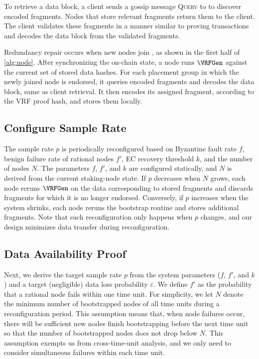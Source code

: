 To retrieve a data block, a client sends a gossip message \textsc{Query} to \sys to discover encoded fragments.
Nodes that store relevant fragments return them to the client.
The client validates these fragments in a manner similar to proving transactions and decodes the data block from the validated fragments.


Redundancy repair occurs when new nodes join \sys, as shown in the first half of \cref{alg:node}.
After synchronizing the on-chain state, a node runs $\VRFGen$ against the current set of stored data hashes.
For each placement group in which the newly joined node is endorsed, it queries encoded fragments and decodes the data block, same as client retrieval.
It then encodes its assigned fragment, according to the VRF proof hash, and stores them locally.

\subsection{Configure Sample Rate}

The sample rate $p$ is periodically reconfigured based on Byzantine fault rate $f$, benign failure rate of rational nodes $f'$, EC recovery threshold $k$, and the number of nodes $N$.
The parameters $f$, $f'$, and $k$ are configured statically, and $N$ is derived from the current staking-node state.
If $p$ decreases when $N$ grows, each node reruns $\VRFGen$ on the data corresponding to stored fragments and discards fragments for which it is no longer endorsed.
Conversely, if $p$ increases when the system shrinks, each node reruns the bootstrap routine and stores additional fragments.
Note that such reconfiguration only happens when $p$ changes, and our design minimizes data transfer during reconfiguration.

\subsection{Data Availability Proof}
\label{sec:design:analysis}

Next, we derive the target sample rate $p$ from the system parameters ($f$, $f'$, and $k$) and a target (negligible) data loss probability $\varepsilon$.
We define $f'$ as the probability that a rational node fails within one time unit.
For simplicity, we let $N$ denote the minimum number of bootstrapped nodes of all time units during a reconfiguration period.
This assumption means that, when node failures occur, there will be sufficient new nodes finish bootstrapping before the next time unit so that the number of bootstrapped nodes does not drop below $N$.
This assumption exempts us from cross-time-unit analysis, and we only need to consider simultaneous failures within each time unit.

